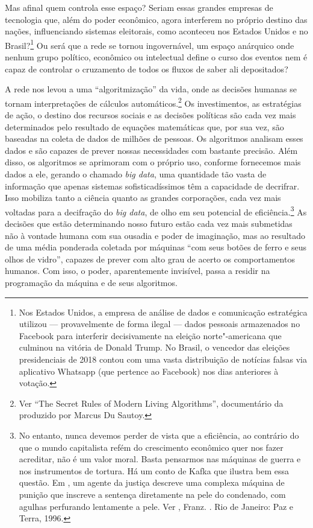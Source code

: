 Mas afinal quem controla esse espaço? Seriam essas grandes empresas de
tecnologia que, além do poder econômico, agora interferem no próprio
destino das nações, influenciando sistemas eleitorais, como aconteceu
nos Estados Unidos e no Brasil?\footnote{Nos Estados Unidos, a empresa
  de análise de dados e comunicação estratégica {}
  utilizou --- provavelmente de forma ilegal --- dados pessoais
  armazenados no Facebook para interferir decisivamente na eleição
  norte"-americana que culminou na vitória de Donald Trump. No Brasil, o
  vencedor das eleições presidenciais de 2018 contou com uma vasta
  distribuição de notícias falsas via aplicativo Whatsapp (que pertence
  ao Facebook) nos dias anteriores à votação.} Ou será que a rede se
tornou ingovernável, um espaço anárquico onde nenhum grupo político, econômico ou
intelectual define o curso dos eventos nem é capaz de controlar o
cruzamento de todos os fluxos de saber ali depositados?

A rede nos levou a uma ``algoritmização'' da vida, onde as decisões
humanas se tornam interpretações de cálculos automáticos.\footnote{Ver ``The Secret Rules of Modern Living Algorithms'', documentário da  produzido por Marcus Du Sautoy.} Os
investimentos, as estratégias de ação, o destino dos recursos sociais e
as decisões políticas são cada vez mais determinados pelo resultado de
equações matemáticas que, por sua vez, são baseadas na coleta de dados
de milhões de pessoas. Os algoritmos analisam esses dados e são capazes de prever nossas necessidades com bastante precisão. Além disso, os algoritmos se aprimoram com o próprio uso, conforme fornecemos mais dados a ele, gerando o chamado \emph{big data}, uma quantidade tão vasta de informação que apenas sistemas sofisticadíssimos têm a capacidade de decrifrar. Isso mobiliza tanto a ciência quanto as grandes corporações, cada vez mais voltadas para a decifração do \emph{big data}, de olho em seu potencial de eficiência.\footnote{No entanto, nunca devemos perder de vista que a eficiência, ao contrário do que o mundo capitalista refém do crescimento econômico quer nos fazer acreditar, não é um valor moral. Basta pensarmos nas máquinas de guerra e nos instrumentos de tortura. Há um conto de Kafka que ilustra bem essa questão. Em {}, um agente da justiça descreve uma complexa máquina de punição que inscreve a sentença diretamente na pele do condenado, com agulhas perfurando lentamente a pele. Ver , Franz. {}. Rio de Janeiro: Paz e Terra, 1996.}
As decisões que estão determinando nosso futuro
estão cada vez mais submetidas não à vontade humana com sua ousadia e
poder de imaginação, mas ao resultado de uma média ponderada coletada
por máquinas ``com seus botões de ferro e seus olhos de vidro'', capazes
de prever com alto grau de acerto os comportamentos humanos. Com isso,
o poder, aparentemente invisível, passa a residir na programação da
máquina e de seus algoritmos.

